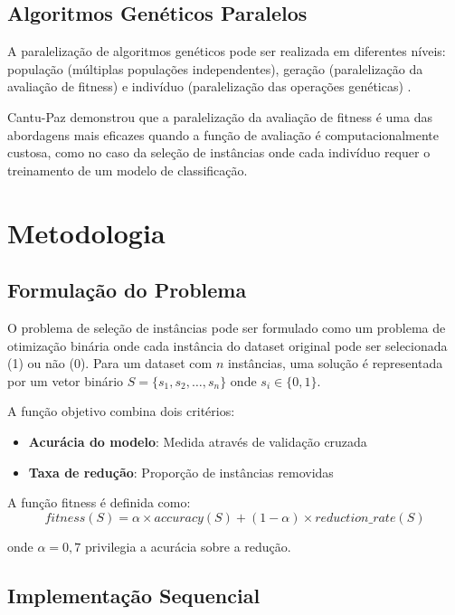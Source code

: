 \documentclass[12pt,a4paper]{article}
\begin{document}
\subsection{Algoritmos Genéticos Paralelos}

A paralelização de algoritmos genéticos pode ser realizada em diferentes níveis: população (múltiplas populações independentes), geração (paralelização da avaliação de fitness) e indivíduo (paralelização das operações genéticas) \cite{alba2002}.

Cantu-Paz \cite{cantupaz2000} demonstrou que a paralelização da avaliação de fitness é uma das abordagens mais eficazes quando a função de avaliação é computacionalmente custosa, como no caso da seleção de instâncias onde cada indivíduo requer o treinamento de um modelo de classificação.

\section{Metodologia}

\subsection{Formulação do Problema}

O problema de seleção de instâncias pode ser formulado como um problema de otimização binária onde cada instância do dataset original pode ser selecionada (1) ou não (0). Para um dataset com $n$ instâncias, uma solução é representada por um vetor binário $S = \{s_1, s_2, \ldots, s_n\}$ onde $s_i \in \{0,1\}$.

A função objetivo combina dois critérios:
\begin{itemize}
    \item \textbf{Acurácia do modelo}: Medida através de validação cruzada
    \item \textbf{Taxa de redução}: Proporção de instâncias removidas
\end{itemize}

A função fitness é definida como:
\begin{equation}
fitness(S) = \alpha \times accuracy(S) + (1-\alpha) \times reduction\_rate(S)
\end{equation}

onde $\alpha = 0,7$ privilegia a acurácia sobre a redução.

\subsection{Implementação Sequencial}
\end{document}
